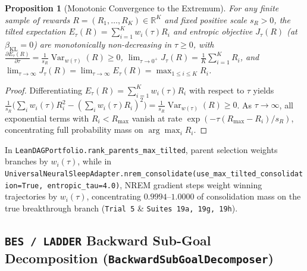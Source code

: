 \documentclass[11pt,a4paper]{article}
\newtheorem{proposition}{Proposition}
\begin{document}
\begin{proposition}[Monotonic Convergence to the Extremum]
\label{prop:max_tilt}
For any finite sample of rewards $R = (R_1, \dots, R_K) \in \mathbb{R}^K$ and fixed positive scale $s_R > 0$, the tilted expectation $E_\tau(R) = \sum_{i=1}^K w_i(\tau) R_i$ and entropic objective $J_\tau(R)$ (at $\beta_{\text{KL}}=0$) are monotonically non-decreasing in $\tau \ge 0$, with $\frac{\partial E_\tau(R)}{\partial \tau} = \frac{1}{s_R}\operatorname{Var}_{w(\tau)}(R) \ge 0$, $\lim_{\tau \to 0^+} J_\tau(R) = \frac{1}{K}\sum_{i=1}^K R_i$, and $\lim_{\tau \to \infty} J_\tau(R) = \lim_{\tau \to \infty} E_\tau(R) = \max_{1 \le i \le K} R_i$.
\end{proposition}
\begin{proof}
Differentiating $E_\tau(R) = \sum_{i=1}^K w_i(\tau) R_i$ with respect to $\tau$ yields $\frac{1}{s_R}\bigl(\sum_i w_i(\tau) R_i^2 - (\sum_i w_i(\tau) R_i)^2\bigr) = \frac{1}{s_R}\operatorname{Var}_{w(\tau)}(R) \ge 0$. As $\tau \to \infty$, all exponential terms with $R_i < R_{\max}$ vanish at rate $\exp(-\tau(R_{\max} - R_i)/s_R)$, concentrating full probability mass on $\arg\max_i R_i$.
\end{proof}

In \texttt{LeanDAGPortfolio.rank\_parents\_max\_tilted}, parent selection weights branches by $w_i(\tau)$, while in \texttt{UniversalNeuralSleepAdapter.nrem\_consolidate(use\_max\_tilted\_consolidation=True, entropic\_tau=4.0)}, NREM gradient steps weight winning trajectories by $w_i(\tau)$, concentrating $\mathbf{0.9994\text{--}1.0000}$ of consolidation mass on the true breakthrough branch (\texttt{Trial 5} \& \texttt{Suites 19a, 19g, 19h}).

\subsection{\texttt{BES / LADDER} Backward Sub-Goal Decomposition (\texttt{BackwardSubGoalDecomposer})}
\end{document}
